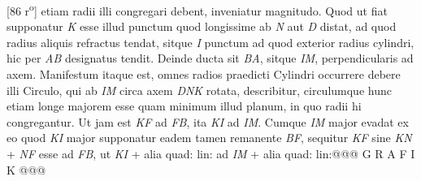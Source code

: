 [86 r\textsuperscript{o}]  etiam radii illi congregari debent, inveniatur magnitudo.  Quod ut fiat supponatur \textit{K} esse illud punctum quod  longissime ab \textit{N} aut \textit{D} distat, ad quod radius aliquis refractus  tendat, sitque \textit{I} punctum ad quod exterior radius cylindri, hic  per \textit{AB} designatus tendit. Deinde ducta sit \textit{BA}, sitque \textit{IM},  perpendicularis ad axem. Manifestum itaque est, omnes  radios praedicti Cylindri occurrere debere illi Circulo, qui ab \textit{IM} circa axem \textit{DNK} rotata, describitur, circulumque  hunc etiam longe majorem esse quam minimum illud planum,  in quo radii hi congregantur. Ut jam est \textit{KF} ad \textit{FB}, ita \textit{KI} ad \textit{IM}. Cumque \textit{IM} major evadat ex eo quod \textit{KI}  major supponatur eadem tamen remanente \textit{BF}, sequitur \textit{KF} sine \textit{KN} + \textit{NF} esse ad \textit{FB}, ut \textit{KI} + alia quad: lin: ad \textit{IM} + alia quad: lin:@@@ G R A F I K @@@%
                    
